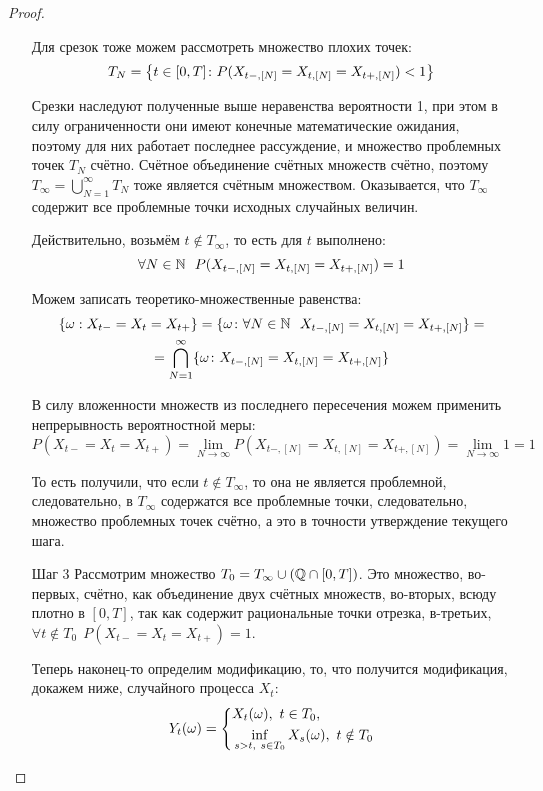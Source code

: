 \begin{proof}
\begin{itemize}
        Для срезок тоже можем рассмотреть множество плохих точек:
        \[
            T_N = \left\{t \in [0, T] \colon P(X_{t-,[N]} = X_{t,[N]} = X_{t+,[N]}) < 1\right\}
        \]

        Срезки наследуют полученные выше неравенства вероятности 1, при этом в силу ограниченности они имеют конечные математические ожидания, поэтому для них работает последнее рассуждение, и множество проблемных точек $T_N$ счётно. Счётное объединение счётных множеств счётно, поэтому $T_\infty = \bigcup\limits_{N=1}^\infty T_N$ тоже является счётным множеством. Оказывается, что $T_\infty$ содержит все проблемные точки исходных случайных величин.

        Действительно, возьмём $t \notin T_\infty$, то есть для $t$ выполнено:
        \[
            \forall N \in \N \ \ P(X_{t-,[N]} = X_{t,[N]} = X_{t+,[N]}) = 1
        \]

        Можем записать теоретико-множественные равенства:
        \begin{multline*}
            \{\omega: X_{t-} = X_t = X_{t+}\} = \{\omega \colon \forall N \in \mathbb{N} \ \ X_{t-,[N]} = X_{t,[N]} = X_{t+,[N]}\} =
            \\
            = \bigcap_{N=1}^\infty \{\omega \colon X_{t-,[N]} = X_{t,[N]} = X_{t+,[N]}\}
        \end{multline*}

        В силу вложенности множеств из последнего пересечения можем применить непрерывность вероятностной меры:
        \[
            P(X_{t-} = X_t = X_{t+}) = \lim_{N \to \infty} P(X_{t-,[N]} = X_{t,[N]} = X_{t+,[N]}) = \lim_{N \to \infty} 1 = 1
        \]
            
        То есть получили, что если $t \notin T_\infty$, то она не является проблемной, следовательно, в $T_\infty$ содержатся все проблемные точки, следовательно, множество проблемных точек счётно, а это в точности утверждение текущего шага.

        \item[Шаг 3] Рассмотрим множество $T_0 = T_\infty \cup (\mathbb{Q} \cap [0, T])$. Это множество, во-первых, счётно, как объединение двух счётных множеств, во-вторых, всюду плотно в $[0, T]$, так как содержит рациональные точки отрезка, в-третьих, $\forall t \notin T_0 \ \ P(X_{t-} = X_t = X_{t+}) = 1$.

        Теперь наконец-то определим модификацию, то, что получится модификация, докажем ниже, случайного процесса $X_t$:
        \[
            Y_t(\omega) = \left\{\begin{aligned}
                & X_t(\omega),\ t \in T_0,
                \\
                & \inf_{s > t,\ s \in T_0} X_s(\omega),\ t \notin T_0
            \end{aligned}\right.
        \]


\end{itemize}
\end{proof}
